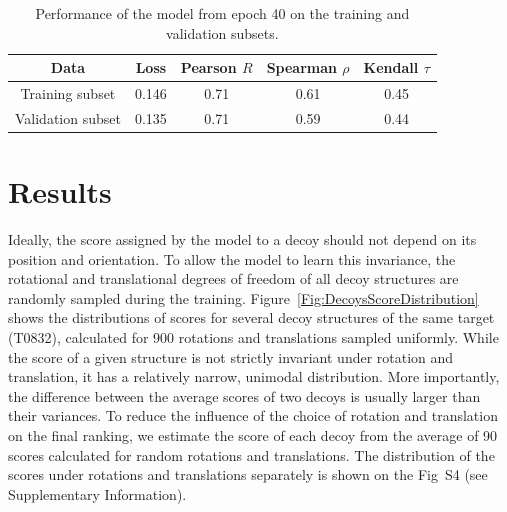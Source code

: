 \documentclass{bioinfo}
\begin{document}
\begin{table}[!t]
\begin{center}
\begin{tabular}{ c | c | c | c | c }
    Data & Loss & Pearson $R$ & Spearman $\rho$ & Kendall $\tau$ \\
    \hline
    Training subset     &0.146 &0.71 &0.61 &0.45 \\
    Validation subset   &0.135 &0.71 &0.59 &0.44 \\ \hline
\end{tabular}
    \caption {Performance of the model from epoch 40 on the training
      and validation subsets.}
    \label{Tbl:TrainingResults}
\end{center}
\end{table}


\section{Results}
Ideally, the score assigned by the model to a decoy should not depend
on its position and orientation.  To allow the model to learn this
invariance, the rotational and translational degrees of freedom of all
decoy structures are randomly sampled during the training.
Figure~\ref{Fig:DecoysScoreDistribution} shows the distributions of
scores for several decoy structures of the same target (T0832),
calculated for 900 rotations and translations sampled uniformly.
While the score of a given structure is not strictly invariant under
rotation and translation, it has a relatively narrow, unimodal
distribution.  More importantly, the difference between the average
scores of two decoys is usually larger than their variances. To reduce
the influence of the choice of rotation and translation on the final
ranking, we estimate the score of each decoy from the average of 90
scores calculated for random rotations and translations. The distribution 
of the scores under rotations and translations separately is shown on 
the Fig~S4 (see Supplementary Information).
\end{document}
